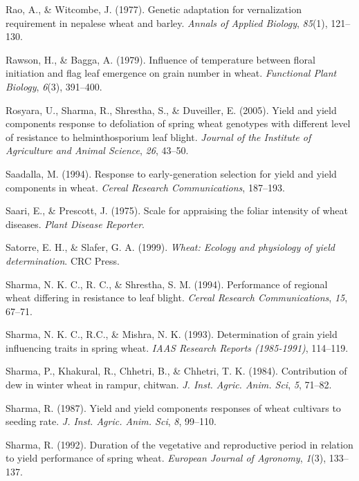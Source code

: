 \documentclass[12pt,oneside]{dukestatscithesis} %
\theoremstyle{definition}
\theoremstyle{definition}
\theoremstyle{definition}
\theoremstyle{remark}
\begin{document}
\hypertarget{ref-rao1977genetic}{}
Rao, A., \& Witcombe, J. (1977). Genetic adaptation for vernalization
requirement in nepalese wheat and barley. \emph{Annals of Applied
Biology}, \emph{85}(1), 121--130.

\hypertarget{ref-rawson1979influence}{}
Rawson, H., \& Bagga, A. (1979). Influence of temperature between floral
initiation and flag leaf emergence on grain number in wheat.
\emph{Functional Plant Biology}, \emph{6}(3), 391--400.

\hypertarget{ref-rosyara2005yield}{}
Rosyara, U., Sharma, R., Shrestha, S., \& Duveiller, E. (2005). Yield
and yield components response to defoliation of spring wheat genotypes
with different level of resistance to helminthosporium leaf blight.
\emph{Journal of the Institute of Agriculture and Animal Science},
\emph{26}, 43--50.

\hypertarget{ref-saadalla1994response}{}
Saadalla, M. (1994). Response to early-generation selection for yield
and yield components in wheat. \emph{Cereal Research Communications},
187--193.

\hypertarget{ref-saari1975scale}{}
Saari, E., \& Prescott, J. (1975). Scale for appraising the foliar
intensity of wheat diseases. \emph{Plant Disease Reporter}.

\hypertarget{ref-satorre1999wheat}{}
Satorre, E. H., \& Slafer, G. A. (1999). \emph{Wheat: Ecology and
physiology of yield determination}. CRC Press.

\hypertarget{ref-sharma1994blight}{}
Sharma, N. K. C., R. C., \& Shrestha, S. M. (1994). Performance of
regional wheat differing in resistance to leaf blight. \emph{Cereal
Research Communications}, \emph{15}, 67--71.

\hypertarget{ref-sharma1993_yield_inf}{}
Sharma, N. K. C., R.C., \& Mishra, N. K. (1993). Determination of grain
yield influencing traits in spring wheat. \emph{IAAS Research Reports
(1985-1991)}, 114--119.

\hypertarget{ref-sharma1984contribution}{}
Sharma, P., Khakural, R., Chhetri, B., \& Chhetri, T. K. (1984).
Contribution of dew in winter wheat in rampur, chitwan. \emph{J. Inst.
Agric. Anim. Sci}, \emph{5}, 71--82.

\hypertarget{ref-sharma1987yield}{}
Sharma, R. (1987). Yield and yield components responses of wheat
cultivars to seeding rate. \emph{J. Inst. Agric. Anim. Sci}, \emph{8},
99--110.

\hypertarget{ref-sharma1992duration}{}
Sharma, R. (1992). Duration of the vegetative and reproductive period in
relation to yield performance of spring wheat. \emph{European Journal of
Agronomy}, \emph{1}(3), 133--137.
\end{document}
